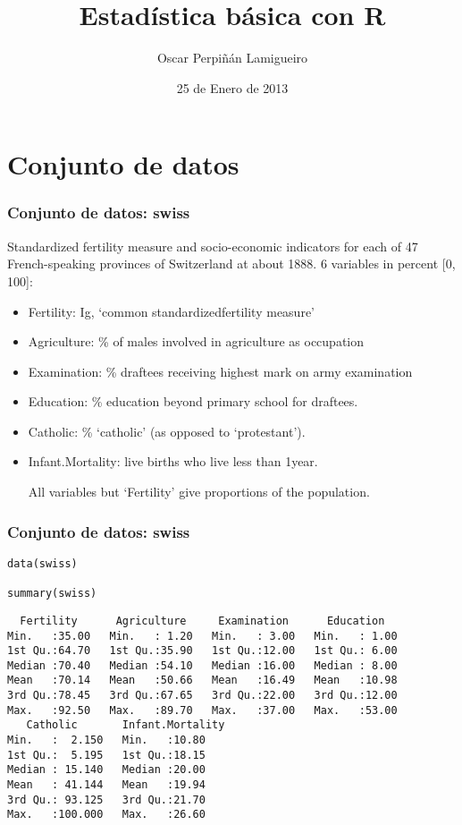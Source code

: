 \documentclass[bigger]{beamer}
\title{Estadística básica con R}
\author{Oscar Perpiñán Lamigueiro}
\date{25 de Enero de 2013}
\begin{document}
\maketitle




\section{Conjunto de datos}
\label{sec-1}
\begin{frame}
\frametitle{Conjunto de datos: swiss}
\label{sec-1-1}

Standardized fertility measure and socio-economic indicators for each
of 47 French-speaking provinces of Switzerland at about 1888. 6 variables in percent [0, 100]:

\begin{itemize}
\item Fertility:         Ig, ‘common standardizedfertility measure’
\item Agriculture:       \% of males involved in agriculture 
                               as occupation
\item Examination:       \% draftees receiving highest mark 
   on army examination
\item Education:         \% education beyond primary school for draftees.
\item Catholic:          \% ‘catholic’ (as opposed to ‘protestant’).
\item Infant.Mortality:  live births who live less than 1year.           
      
     All variables but ‘Fertility’ give proportions of the population.
\end{itemize}
\end{frame}
\begin{frame}[fragile]
\frametitle{Conjunto de datos: swiss}
\label{sec-1-2}



\lstset{language=R}
\begin{lstlisting}
data(swiss)

summary(swiss)
\end{lstlisting}


\begin{verbatim}
  Fertility      Agriculture     Examination      Education    
Min.   :35.00   Min.   : 1.20   Min.   : 3.00   Min.   : 1.00  
1st Qu.:64.70   1st Qu.:35.90   1st Qu.:12.00   1st Qu.: 6.00  
Median :70.40   Median :54.10   Median :16.00   Median : 8.00  
Mean   :70.14   Mean   :50.66   Mean   :16.49   Mean   :10.98  
3rd Qu.:78.45   3rd Qu.:67.65   3rd Qu.:22.00   3rd Qu.:12.00  
Max.   :92.50   Max.   :89.70   Max.   :37.00   Max.   :53.00  
   Catholic       Infant.Mortality
Min.   :  2.150   Min.   :10.80   
1st Qu.:  5.195   1st Qu.:18.15   
Median : 15.140   Median :20.00   
Mean   : 41.144   Mean   :19.94   
3rd Qu.: 93.125   3rd Qu.:21.70   
Max.   :100.000   Max.   :26.60
\end{verbatim}
\end{frame}
\end{document}
